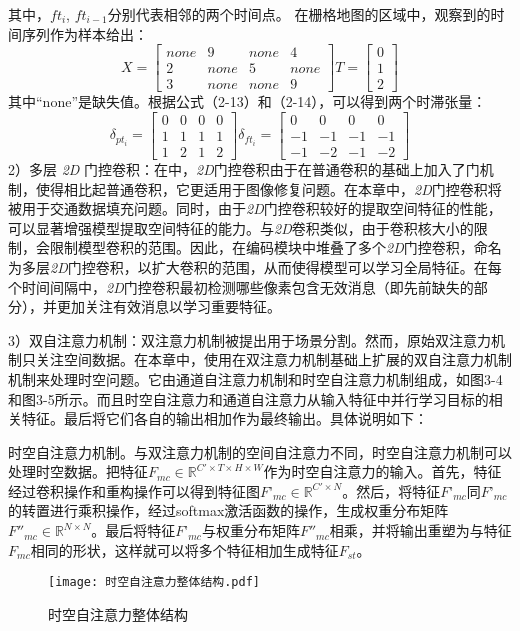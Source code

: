 其中，$ft_i$, $ft_{i-1}$分别代表相邻的两个时间点。
在栅格地图的区域中，观察到的时间序列作为样本给出：
\begin{equation}
X= \begin{bmatrix}
none & 9 & none & 4\\
2 & none & 5 & none\\
3 & none & none & 9\nonumber
\end{bmatrix}
T= \begin{bmatrix}
0\\
1\\
2\nonumber
\end{bmatrix}
\end{equation}
其中“none”是缺失值。根据公式（2-13）和（2-14），可以得到两个时滞张量：
\begin{equation}
{\delta}_{pt_i}= \begin{bmatrix}
0 & 0 & 0 & 0\\
1 & 1 & 1 & 1\\
1 & 2 & 1 & 2\nonumber
\end{bmatrix}
{\delta}_{ft_i}= \begin{bmatrix}
0 & 0 & 0 & 0\\
-1 & -1 & -1 & -1\\
-1 & -2 & -1 & -2\nonumber
\end{bmatrix}
\end{equation}
2）多层 \textit{2D} 门控卷积：在\cite{10}中，\textit{2D}门控卷积由于在普通卷积的基础上加入了门机制，使得相比起普通卷积，它更适用于图像修复问题。在本章中，\textit{2D}门控卷积将被用于交通数据填充问题。同时，由于\textit{2D}门控卷积较好的提取空间特征的性能，可以显著增强模型提取空间特征的能力。与\textit{2D}卷积类似，由于卷积核大小的限制，会限制模型卷积的范围。因此，在编码模块中堆叠了多个\textit{2D}门控卷积，命名为多层\textit{2D}门控卷积，以扩大卷积的范围，从而使得模型可以学习全局特征。在每个时间间隔中，\textit{2D}门控卷积最初检测哪些像素包含无效消息（即先前缺失的部分），并更加关注有效消息以学习重要特征。

3）双自注意力机制：双注意力机制\cite{15}被提出用于场景分割。然而，原始双注意力机制只关注空间数据。在本章中，使用在双注意力机制基础上扩展的双自注意力机制机制来处理时空问题。它由通道自注意力机制和时空自注意力机制组成，如图3-4和图3-5所示。而且时空自注意力和通道自注意力从输入特征中并行学习目标的相关特征。最后将它们各自的输出相加作为最终输出。具体说明如下：

时空自注意力机制。与双注意力机制的空间自注意力不同，时空自注意力机制可以处理时空数据。把特征$F_{mc}\in \mathbb{R}^{C'\times T\times H\times W}$作为时空自注意力的输入。首先，特征经过卷积操作和重构操作可以得到特征图$F’_{mc}\in \mathbb{R}^{C'\times N}$。然后，将特征$F’_{mc}$同$F’_{mc}$的转置进行乘积操作，经过softmax激活函数的操作，生成权重分布矩阵$F''_{mc}\in \mathbb{R}^{N\times N}$。最后将特征$F’_{mc}$与权重分布矩阵$F''_{mc}$相乘，并将输出重塑为与特征$F_{mc}$相同的形状，这样就可以将多个特征相加生成特征$F_{st}$。
\begin{figure}[htbp]
\centerline{\texttt{[image: 时空自注意力整体结构.pdf]}}
\caption{时空自注意力整体结构}
\label{fig}
\end{figure}

